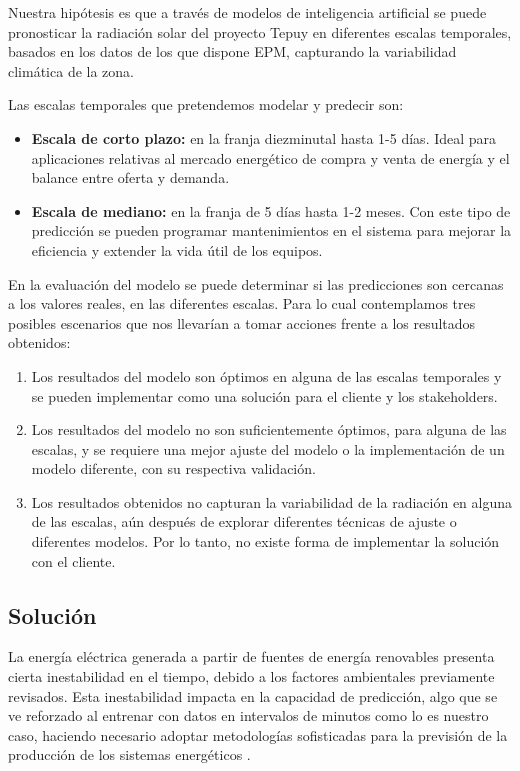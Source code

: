 \documentclass[a4paper]{article}
\begin{document}
Nuestra hipótesis es que a través de modelos de inteligencia artificial se puede pronosticar la radiación solar del proyecto Tepuy en diferentes escalas temporales, basados en los datos de los que dispone EPM, capturando la variabilidad climática de la zona. 

Las escalas temporales que pretendemos modelar y predecir son:

\begin{itemize}
    \item \textbf{Escala de corto plazo:} en la franja diezminutal hasta 1-5 días. Ideal para aplicaciones relativas al mercado energético de compra y venta de energía y el balance entre oferta y demanda.
    \item \textbf{Escala de mediano:} en la franja de 5 días hasta 1-2 meses. Con este tipo de predicción se pueden programar mantenimientos en el sistema para mejorar la eficiencia y extender la vida útil de los equipos.
\end{itemize}

En la evaluación del modelo se puede determinar si las predicciones son cercanas a los valores reales, en las diferentes escalas.  Para lo cual contemplamos tres posibles escenarios que nos llevarían a tomar acciones frente a los resultados obtenidos:

\begin{enumerate}
    \item Los resultados del modelo son óptimos en alguna de las escalas temporales y se pueden implementar como una solución para el cliente y los stakeholders.
    \item Los resultados del modelo no son suficientemente óptimos, para alguna de las escalas, y se requiere una mejor ajuste del modelo o la implementación de un modelo diferente, con su respectiva validación.
    \item Los resultados obtenidos no capturan la variabilidad de la radiación en alguna de las escalas, aún después de explorar diferentes técnicas de ajuste o diferentes modelos. Por lo tanto, no existe forma de implementar la solución con el cliente.
\end{enumerate}

\subsection{Solución}

La energía eléctrica generada a partir de fuentes de energía renovables presenta cierta inestabilidad en el tiempo, debido a los factores ambientales previamente revisados. Esta inestabilidad impacta en la capacidad de predicción, algo que se ve reforzado al entrenar con datos en intervalos de minutos como lo es nuestro caso, haciendo necesario adoptar metodologías sofisticadas para la previsión de la producción de los sistemas energéticos \cite{ref:comprehensiveassessment}.
\end{document}

